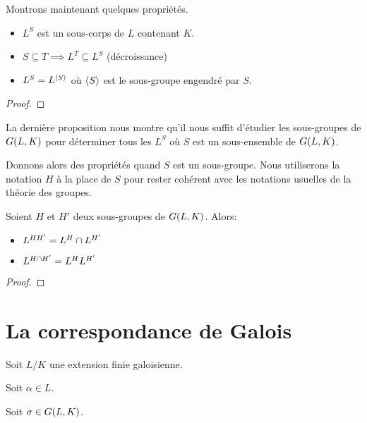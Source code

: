 Montrons maintenant quelques propriétés.

\begin{proposition}
	\label{prop:correspondance_subgroup_to_subfield}
	\begin{itemize}
		\item $L^{S}$ est un sous-corps de $L$ contenant $K$.
		\item $S \subseteq T \implies L^{T} \subseteq L^{S}$ (décroissance)
		\item $L^{S} = L^{\left<S\right>}$ où $\left<S\right>$ est le
			sous-groupe engendré par $S$.
	\end{itemize}
\end{proposition}

\ifdefined\outputproof
\begin{proof}

\end{proof}
\fi

La dernière proposition nous montre qu'il nous suffit d'étudier les sous-groupes
de $G(L, K)$ pour déterminer tous les $L^{S}$ où $S$ est un
sous-ensemble de $G(L, K)$.

Donnons alors des propriétés quand $S$ est un sous-groupe. Nous utiliserons la
notation $H$ à la place de $S$ pour rester cohérent avec les notations usuelles
de la théorie des groupes.

\begin{proposition}
	Soient $H$ et $H'$ deux sous-groupes de $G(L, K)$. Alors:
	\begin{itemize}
		\item $L^{HH'} = L^{H} \cap L^{H'}$
		\item $L^{H \cap H'} = L^{H} L^{H'}$
	\end{itemize}
\end{proposition}

\ifdefined\outputproof
\begin{proof}

\end{proof}
\fi

\section{La correspondance de Galois}

Soit $L/K$ une extension finie galoisienne.

Soit $\alpha \in L$.

Soit $\sigma \in G(L, K)$.

